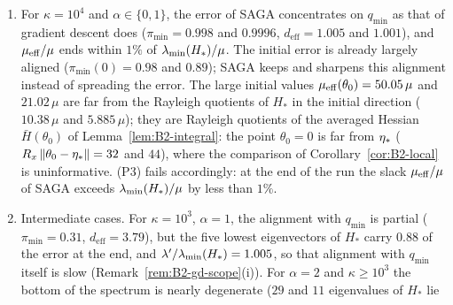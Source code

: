 \begin{remark}
\begin{enumerate}[label=(\alph*),leftmargin=*,topsep=2pt,itemsep=1pt]
$q_{\min}$ ($\pi_{\min}\le0.05$ at every state of the last five recorded passes), and over these passes the geometric
mean of $\muEff/\mu$ is between $1.25$ and $2.6$ times $\lmin(H_\ast)/\mu$ (single states fluctuate between $1.2$ and
$6.0$ times; the ``end'' columns of the table are single states), whereas gradient descent ends closer to
$\lmin(H_\ast)/\mu$. For $\alpha\in\{0,1\}$ the error stays spread over many directions ($d_{\mathrm{eff}}$ averages $14$
to $18$ over the last five passes). The run $\kappa=10^3$, $\alpha=0$ is the clearest: the initial error
$-\etastar$ is concentrated on $q_{\min}$ ($\pi_{\min}(0)=0.96$), gradient descent keeps it there and SAGA spreads it out,
although the spectral gap is large ($\lambda'/\lmin(H_\ast)=1.46$). For $\alpha=2$, $\kappa=10^2$, $d_{\mathrm{eff}}$ is
smaller (mean $5.4$ over the last five passes), but the five lowest eigenvectors of $H_\ast$ carry only $0.005$ of the
error and the geometric mean of $\muEff/\mu$ is $2.6$: the error sits on intermediate- and high-curvature directions,
consistently with the ``data-shaped'' noise (ii) above, whose weights vanish on the directions with
$\lambda_k\approx\lambda$.
\item For $\kappa=10^4$ and $\alpha\in\{0,1\}$, the error of SAGA concentrates on $q_{\min}$ as that of gradient descent
does ($\pi_{\min}=0.998$ and $0.9996$, $d_{\mathrm{eff}}=1.005$ and $1.001$), and $\muEff/\mu$ ends within $1\%$ of
$\lmin(H_\ast)/\mu$. The initial error is already largely aligned ($\pi_{\min}(0)=0.98$ and $0.89$); SAGA keeps and sharpens
this alignment instead of spreading the error. The large initial values $\mu_{\mathrm{eff}}(\theta_0)=50.05\,\mu$ and
$21.02\,\mu$ are far from the Rayleigh quotients of $H_\ast$ in the initial direction ($10.38\,\mu$ and $5.885\,\mu$); they
are Rayleigh quotients of the averaged Hessian $\bar H(\theta_0)$ of Lemma~\ref{lem:B2-integral}: the point
$\theta_0=0$ is far from $\eta_\ast$ ($R_x\left\|\theta_0-\eta_\ast\right\|=32$ and $44$), where the comparison of
Corollary~\ref{cor:B2-local} is uninformative. (P3) fails accordingly: at the end of the run the slack $\muEff/\mu$ of SAGA
exceeds $\lmin(H_\ast)/\mu$ by less than $1\%$.
\item Intermediate cases. For $\kappa=10^3$, $\alpha=1$, the alignment with $q_{\min}$ is partial ($\pi_{\min}=0.31$,
$d_{\mathrm{eff}}=3.79$), but the five lowest eigenvectors of $H_\ast$ carry $0.88$ of the error at the end, and
$\lambda'/\lambda_{\min}(H_\ast)=1.005$, so that alignment with $q_{\min}$ itself is slow (Remark~\ref{rem:B2-gd-scope}(i)). For
$\alpha=2$ and $\kappa\ge10^3$ the bottom of the spectrum is nearly degenerate ($29$ and $11$ eigenvalues of $H_\ast$ lie

\end{enumerate}
\end{remark}
